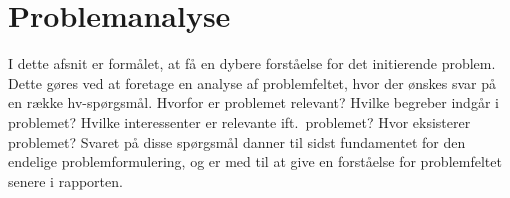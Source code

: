 \section{Problemanalyse}
I dette afsnit er formålet, at få en dybere forståelse for det initierende problem. Dette gøres ved at foretage en analyse af problemfeltet, hvor der ønskes svar på en række hv-spørgsmål. Hvorfor er problemet relevant? Hvilke begreber indgår i problemet? Hvilke interessenter er relevante ift.\ problemet? Hvor eksisterer problemet? Svaret på disse spørgsmål danner til sidst fundamentet for den endelige problemformulering, og er med til at give en forståelse for problemfeltet senere i rapporten.


\clearpage

\clearpage

\clearpage

\clearpage